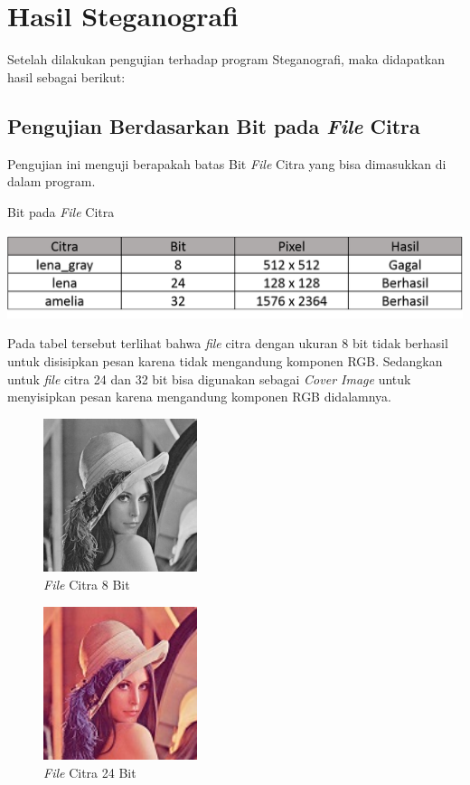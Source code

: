 \section{Hasil Steganografi}
Setelah dilakukan pengujian terhadap program Steganografi, maka didapatkan hasil sebagai berikut:
	\subsection{Pengujian Berdasarkan Bit pada \emph{File} Citra}
	Pengujian ini menguji berapakah batas Bit \emph{File} Citra yang bisa dimasukkan di dalam program.
	
	\begin{table}[H]
		\centering
		\caption{Bit pada \emph{File} Citra}
		\includegraphics[width=1.0\textwidth]{gambar/table_bitcitra}
		\label{tabel_bitcitra}
	\end{table}
	
	Pada tabel tersebut terlihat bahwa \emph{file} citra dengan ukuran 8 bit tidak berhasil untuk disisipkan pesan karena tidak mengandung komponen RGB. Sedangkan untuk \emph{file} citra 24 dan 32 bit bisa digunakan sebagai \emph{Cover Image} untuk menyisipkan pesan karena mengandung komponen RGB didalamnya.
	
	\begin{figure}[H]
		\centering
		\includegraphics[width=0.4\textwidth]{gambar/matlab/lena_gray}
		\caption{\emph{File} Citra 8 Bit}
		\label{lena_gray8}
	\end{figure}
	
	\begin{figure}[H]
		\centering
		\includegraphics[width=0.4\textwidth]{gambar/matlab/lena}
		\caption{\emph{File} Citra 24 Bit}
		\label{lena24}
	\end{figure}

